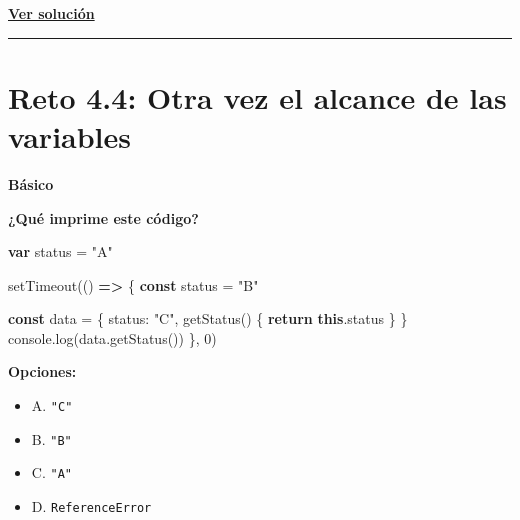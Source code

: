 \documentclass[
  letterpaper,
  DIV=11,
  numbers=noendperiod]{scrreprt}
\newenvironment{Shaded}{\begin{snugshade}}{\end{snugshade}}
\newcommand{\AttributeTok}[1]{\textcolor[rgb]{0.40,0.45,0.13}{#1}}
\newcommand{\BuiltInTok}[1]{\textcolor[rgb]{0.00,0.23,0.31}{#1}}
\newcommand{\ControlFlowTok}[1]{\textcolor[rgb]{0.00,0.23,0.31}{\textbf{#1}}}
\newcommand{\DataTypeTok}[1]{\textcolor[rgb]{0.68,0.00,0.00}{#1}}
\newcommand{\DecValTok}[1]{\textcolor[rgb]{0.68,0.00,0.00}{#1}}
\newcommand{\FunctionTok}[1]{\textcolor[rgb]{0.28,0.35,0.67}{#1}}
\newcommand{\KeywordTok}[1]{\textcolor[rgb]{0.00,0.23,0.31}{\textbf{#1}}}
\newcommand{\NormalTok}[1]{\textcolor[rgb]{0.00,0.23,0.31}{#1}}
\newcommand{\OperatorTok}[1]{\textcolor[rgb]{0.37,0.37,0.37}{#1}}
\newcommand{\PreprocessorTok}[1]{\textcolor[rgb]{0.68,0.00,0.00}{#1}}
\newcommand{\StringTok}[1]{\textcolor[rgb]{0.13,0.47,0.30}{#1}}
\providecommand{\tightlist}{%
  \setlength{\itemsep}{0pt}\setlength{\parskip}{0pt}}
\begin{document}
\textbf{\hyperref[sec-sol-cap4-reto3]{Ver solución}}

\begin{center}\rule{0.5\linewidth}{0.5pt}\end{center}

\section{Reto 4.4: Otra vez el alcance de las
variables}\label{sec-cap4-reto4}

\begin{tcolorbox}[enhanced jigsaw, left=2mm, toprule=.15mm, leftrule=.75mm, breakable, colback=white, coltitle=black, bottomtitle=1mm, arc=.35mm, rightrule=.15mm, colframe=quarto-callout-caution-color-frame, opacitybacktitle=0.6, toptitle=1mm, opacityback=0, titlerule=0mm, title=\textcolor{quarto-callout-caution-color}{\faFire}\hspace{0.5em}{Dificultad}, bottomrule=.15mm, colbacktitle=quarto-callout-caution-color!10!white]

\textbf{Básico}

\end{tcolorbox}

\textbf{¿Qué imprime este código?}

\begin{Shaded}
\begin{Highlighting}[]
\KeywordTok{var}\NormalTok{ status }\OperatorTok{=} \StringTok{"A"}

\PreprocessorTok{setTimeout}\NormalTok{(() }\KeywordTok{=\textgreater{}}\NormalTok{ \{}
  \KeywordTok{const}\NormalTok{ status }\OperatorTok{=} \StringTok{"B"}

  \KeywordTok{const}\NormalTok{ data }\OperatorTok{=}\NormalTok{ \{}
    \DataTypeTok{status}\OperatorTok{:} \StringTok{"C"}\OperatorTok{,}
    \FunctionTok{getStatus}\NormalTok{() \{}
      \ControlFlowTok{return} \KeywordTok{this}\OperatorTok{.}\AttributeTok{status}
\NormalTok{    \}}
\NormalTok{  \}}
  \BuiltInTok{console}\OperatorTok{.}\FunctionTok{log}\NormalTok{(data}\OperatorTok{.}\FunctionTok{getStatus}\NormalTok{())}
\NormalTok{\}}\OperatorTok{,} \DecValTok{0}\NormalTok{)}
\end{Highlighting}
\end{Shaded}

\textbf{Opciones:}

\begin{itemize}
\tightlist
\item
  A. \texttt{"C"}
\item
  B. \texttt{"B"}
\item
  C. \texttt{"A"}
\item
  D. \texttt{ReferenceError}
\end{itemize}
\end{document}

